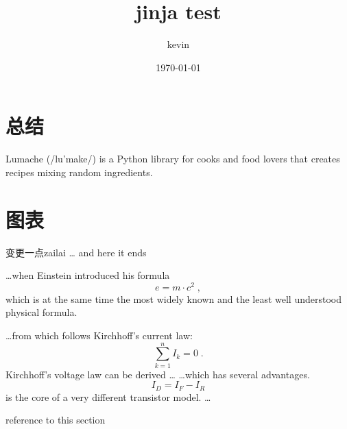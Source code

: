 \documentclass[a4paper,10pt,titlepage]{report}
\title{jinja test}
\date{\today}
\author{kevin}
\begin{document}
\maketitle
\setcounter{secnumdepth}{0}


\section{总结}
Lumache (/lu’make/) is a Python library for cooks and food lovers that
creates recipes mixing random ingredients.


\section{图表}
变更一点zailai
\label{chart}
\ldots{} and here it ends

\ldots when Einstein introduced his formula
\begin{equation}
e = m \cdot c^2 \; ,
\end{equation}
which is at the same time the most widely known
and the least well understood physical formula.

\ldots from which follows Kirchhoff's current law:
\begin{equation}
\sum_{k=1}^{n} I_k = 0 \; .
\end{equation}
Kirchhoff's voltage law can be derived \ldots \newline
\ldots which has several advantages.
\begin{equation}
I_D = I_F - I_R
\end{equation}
is the core of a very different transistor model. \ldots

reference to this section \pageref{chart}

\tnss
\end{document}
